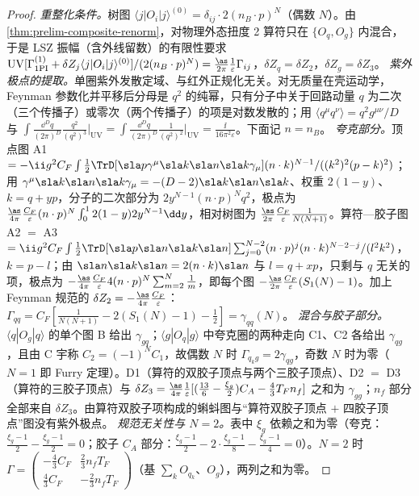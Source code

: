 \begin{proof}
\emph{重整化条件。}树图 $\langle j|O_i|j\rangle^{(0)}=\delta_{ij}\cdot2(n_B\cdot p)^N$（偶数 $N$）。由\cref{thm:prelim-composite-renorm}，对物理外态扭度 2 算符只在 $\{O_q,O_g\}$ 内混合，于是 LSZ 振幅（含外线留数）的有限性要求 $\mathrm{UV}[\Gamma^{(1)}_{\mathrm{1PI}}+\delta Z_j\langle j|O_i|j\rangle^{(0)}]/(2(n_B\cdot p)^N)=\frac{\as}{2\pi}\frac1\varepsilon\Gamma_{ij}$，$\delta Z_q=\delta Z_2$，$\delta Z_g=\delta Z_3$。
\emph{紫外极点的提取。}单圈紫外发散定域、与红外正规化无关。对无质量在壳运动学，Feynman 参数化并平移后分母是 $q^2$ 的纯幂，只有分子中关于回路动量 $q$ 为二次（三个传播子）或零次（两个传播子）的项是对数发散的；用 $\langle q^\mu q^\nu\rangle=q^2g^{\mu\nu}/D$ 与 $\int\frac{\dd^Dq}{(2\pi)^D}\frac{q^2}{(q^2)^3}\big|_{\mathrm{UV}}=\int\frac{\dd^Dq}{(2\pi)^D}\frac{1}{(q^2)^2}\big|_{\mathrm{UV}}=\frac{\ii}{16\pi^2\varepsilon}$。下面记 $n=n_B$。
\emph{夸克部分。}顶点图 A1 $=-\ii g^2C_F\int\frac12\TrD[\sla p\gamma^\mu\sla k\sla n\sla k\gamma_\mu](n\cdot k)^{N-1}/((k^2)^2(p-k)^2)$；用 $\gamma^\mu\sla k\sla n\sla k\gamma_\mu=-(D-2)\sla k\sla n\sla k$、权重 $2(1-y)$、$k=q+yp$，分子的二次部分为 $2y^{N-1}(n\cdot p)^Nq^2$，极点为 $\frac{\as}{4\pi}\frac{C_F}\varepsilon(n\cdot p)^N\int_0^12(1-y)2y^{N-1}\dd y$，相对树图为 $\frac{\as}{2\pi}\frac{C_F}\varepsilon\frac1{N(N+1)}$。算符—胶子图 A2 $=$ A3 $=\ii g^2C_F\int\frac12\TrD[\sla p\sla n\sla k\sla n]\sum_{j=0}^{N-2}(n\cdot p)^j(n\cdot k)^{N-2-j}/(l^2k^2)$，$k=p-l$；由 $\sla n\sla k\sla n=2(n\cdot k)\sla n$ 与 $l=q+xp$，只剩与 $q$ 无关的项，极点为 $-\frac{\as}{4\pi}\frac{C_F}\varepsilon4(n\cdot p)^N\sum_{m=2}^N\frac1m$，即每个图 $-\frac{\as}{2\pi}\frac{C_F}{\varepsilon}(S_1(N)-1)$。加上 Feynman 规范的 $\delta Z_2=-\frac{\as}{4\pi}\frac{C_F}{\varepsilon}$：$\Gamma_{qq}=C_F[\frac{1}{N(N+1)}-2(S_1(N)-1)-\frac12]=\gamma_{qq}(N)$。
\emph{混合与胶子部分。}$\langle q|O_g|q\rangle$ 的单个图 B 给出 $\gamma_{gq}$；$\langle g|O_q|g\rangle$ 中夸克圈的两种走向 C1、C2 各给出 $\gamma_{qg}$，且由 C 宇称 $C_2=(-1)^NC_1$，故偶数 $N$ 时 $\Gamma_{q_kg}=2\gamma_{qg}$，奇数 $N$ 时为零（$N=1$ 即 Furry 定理）。D1（算符的双胶子顶点与两个三胶子顶点）、D2 $=$ D3（算符的三胶子顶点）与 $\delta Z_3=\frac{\as}{4\pi}\frac1\varepsilon[(\frac{13}6-\frac{\xi_g}2)C_A-\frac43T_Fn_f]$ 之和为 $\gamma_{gg}$；$n_f$ 部分全部来自 $\delta Z_3$。由算符双胶子项构成的蝌蚪图与“算符双胶子顶点 $+$ 四胶子顶点”图没有紫外极点。
\emph{规范无关性与 $N=2$。}表中 $\xi_g$ 依赖之和为零（夸克：$\frac{\xi_g-1}2-\frac{\xi_g-1}2=0$；胶子 $C_A$ 部分：$\frac{\xi_g-1}2-2\cdot\frac{\xi_g-1}8-\frac{\xi_g-1}4=0$）。$N=2$ 时 $\Gamma=\begin{pmatrix}-\frac43C_F&\frac23n_fT_F\\\frac43C_F&-\frac23n_fT_F\end{pmatrix}$（基 $\sum_kO_{q_k}$、$O_g$），两列之和为零。
\end{proof}

